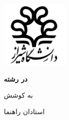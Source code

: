 \begin{titlepage}
    \centering
    \includegraphics[width=0.25\textwidth]{assets/shiraz_university_logo}

    \vspace{\baselineskip}
    \textbf{\PersianSchool}

    \textbf{{\PersianType} {\PersianDegree} در رشته \\ {\PersianField}}

    \vspace{3\baselineskip}
    \textbf{\large \PersianTitle}

    \vspace{3\baselineskip}
    به کوشش \\
    \textbf{\PersianName}

    \vspace{2\baselineskip}
    استادان راهنما \\
    \textbf{\PersianSupervisor} \\ \textbf{\PersianSupervisorB}

    \vspace{\baselineskip}
    \textbf{\PersianDate}
\end{titlepage}
